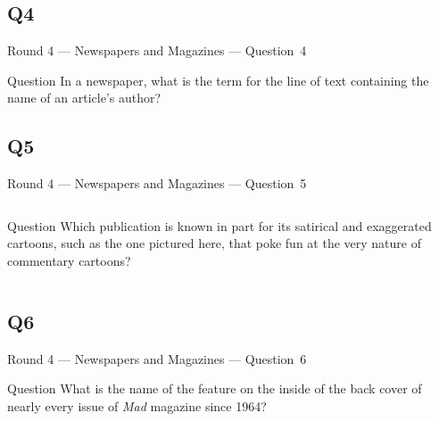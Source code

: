 \documentclass[11pt]{beamer}
\begin{document}
\subsection*{Q4}
\begin{frame}[t]{Round 4 --- Newspapers and Magazines --- \mbox{Question 4}}
    \vspace{-0.5em}
    \begin{block}{Question}
        In a newspaper, what is the term for the line of text containing the name of an article's author?
    \end{block}
\end{frame}
\subsection*{Q5}
\begin{frame}[t]{Round 4 --- Newspapers and Magazines --- \mbox{Question 5}}
    \vspace{-0.5em}
    \begin{columns}[T,totalwidth=\linewidth]
        \begin{column}{0.32\linewidth}
            \begin{block}{Question}
                Which publication is known in part for its satirical and exaggerated cartoons, such as the one pictured here, that poke fun at the very nature of commentary cartoons?
            \end{block}
        \end{column}
        \begin{column}{0.65\linewidth}
            \begin{center}
                \texttt{[image: \{Images/onioncartoon]}.jpg}
            \end{center}
        \end{column}
    \end{columns}
\end{frame}
\subsection*{Q6}
\begin{frame}[t]{Round 4 --- Newspapers and Magazines --- \mbox{Question 6}}
    \vspace{-0.5em}
    \begin{block}{Question}
        What is the name of the feature on the inside of the back cover of nearly every issue of \emph{Mad} magazine since 1964?
    \end{block}
\end{frame}
\end{document}
